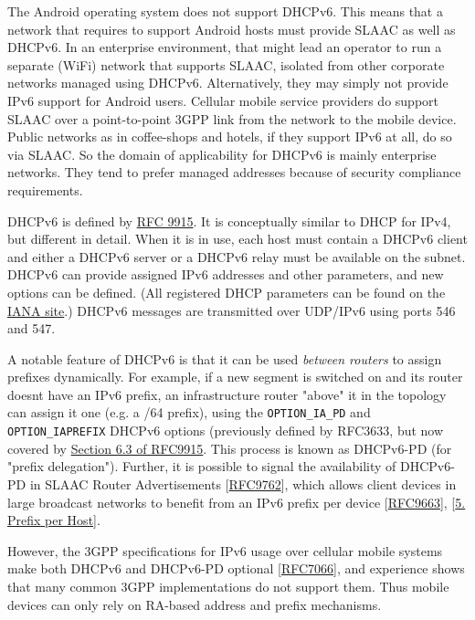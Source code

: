 \documentclass[
]{article}
\begin{document}
The Android operating system does not support DHCPv6. This means that a
network that requires to support Android hosts must provide SLAAC as
well as DHCPv6. In an enterprise environment, that might lead an
operator to run a separate (WiFi) network that supports SLAAC, isolated
from other corporate networks managed using DHCPv6. Alternatively, they
may simply not provide IPv6 support for Android users. Cellular mobile
service providers do support SLAAC over a point-to-point 3GPP link from
the network to the mobile device. Public networks as in coffee-shops and
hotels, if they support IPv6 at all, do so via SLAAC. So the domain of
applicability for DHCPv6 is mainly enterprise networks. They tend to
prefer managed addresses because of security compliance requirements.

DHCPv6 is defined by \href{https://www.rfc-editor.org/info/rfc9915}{RFC
9915}. It is conceptually similar to DHCP for IPv4, but different in
detail. When it is in use, each host must contain a DHCPv6 client and
either a DHCPv6 server or a DHCPv6 relay must be available on the
subnet. DHCPv6 can provide assigned IPv6 addresses and other parameters,
and new options can be defined. (All registered DHCP parameters can be
found on the
\href{https://www.iana.org/assignments/dhcpv6-parameters/dhcpv6-parameters.xhtml\#dhcpv6-parameters-2}{IANA
site}.) DHCPv6 messages are transmitted over UDP/IPv6 using ports 546
and 547.

A notable feature of DHCPv6 is that it can be used \emph{between
routers} to assign prefixes dynamically. For example, if a new segment
is switched on and its router doesn\textquotesingle t have an IPv6
prefix, an infrastructure router "above" it in the topology can assign
it one (e.g. a /64 prefix), using the \texttt{OPTION\_IA\_PD} and
\texttt{OPTION\_IAPREFIX} DHCPv6 options (previously defined by RFC3633,
but now covered by
\href{https://www.rfc-editor.org/rfc/rfc9915.html\#section-6.3}{Section
6.3 of RFC9915}. This process is known as DHCPv6-PD (for "prefix
delegation"). Further, it is possible to signal the availability of
DHCPv6-PD in SLAAC Router Advertisements
{[}\href{https://www.rfc-editor.org/info/rfc9762}{RFC9762}{]}, which
allows client devices in large broadcast networks to benefit from an
IPv6 prefix per device
{[}\href{https://www.rfc-editor.org/info/rfc9663}{RFC9663}{]},
{[}\hyperref[prefix-per-host]{5. Prefix per Host}{]}.

However, the 3GPP specifications for IPv6 usage over cellular mobile
systems make both DHCPv6 and DHCPv6-PD optional
{[}\href{https://www.rfc-editor.org/info/rfc7066}{RFC7066}{]}, and
experience shows that many common 3GPP implementations do not support
them. Thus mobile devices can only rely on RA-based address and prefix
mechanisms.
\end{document}
